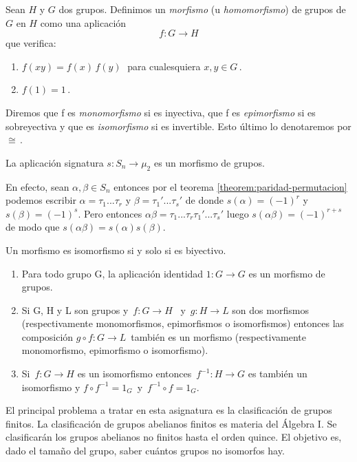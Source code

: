 \begin{ndef}
Sean $H$ y $G$ dos grupos. Definimos un \textit{morfismo} (u \textit{homomorfismo}) de grupos de $G$ en $H$ como una aplicación \begin{equation*}
  f:G \to H
\end{equation*} que verifica: \begin{enumerate}
  \item $f(xy) = f(x)\,f(y) \;$ para cualesquiera $x,y \in G$\,.
  \item $f(1) = 1$\,.
\end{enumerate}

Diremos que f es \textit{monomorfismo} si es inyectiva, que f es \textit{epimorfismo} si es sobreyectiva y que es \textit{isomorfismo} si es invertible. Esto último lo denotaremos por $\cong$\,.
\end{ndef}

\begin{ejemplo}
La aplicación signatura $s:S_n \rightarrow \mu_2$ es un morfismo de grupos.

En efecto, sean $\alpha,\beta \in S_n$ entonces por el teorema \ref{theorem:paridad-permutacion} podemos escribir $\alpha = \tau_1...\tau_r$ y $\beta = \tau_1'...\tau_s'$ de donde $s(\alpha) = (-1)^r$ y $s(\beta) = (-1)^s$. Pero entonces $\alpha\beta = \tau_1...\tau_r\tau_1'...\tau_s'$ luego $s(\alpha\beta) = (-1)^{r+s}$ de modo que $s(\alpha\beta) = s(\alpha)s(\beta)$.
\end{ejemplo}

\begin{nprop}
Un morfismo es isomorfismo si y solo si es biyectivo.
\end{nprop}

\begin{nprop}\hfill \begin{enumerate}
  \item Para todo grupo G, la aplicación identidad $1:G \to G$ es un morfismo de grupos.
  \item Si G, H y L son grupos y\, $f:G \rightarrow H$ \, y\, $g:H \rightarrow L$ son dos morfismos (respectivamente monomorfismos, epimorfismos o isomorfismos) entonces las composición $g \circ f:G \rightarrow L$\, también es un morfismo (respectivamente monomorfismo, epimorfismo o isomorfismo).
  \item Si \,$f:G \to H$ es un isomorfismo entonces \,$f^{-1}:H \to G$ es también un isomorfismo y $f \circ f^{-1} = 1_G$\, y \,$f^{-1} \circ f = 1_G$.
\end{enumerate}
\end{nprop}

El principal problema a tratar en esta asignatura es la clasificación de grupos finitos. La clasificación de grupos abelianos finitos es materia del Álgebra I. Se clasificarán los grupos abelianos no finitos hasta el orden quince. El objetivo es, dado el tamaño del grupo, saber cuántos grupos no isomorfos hay.

